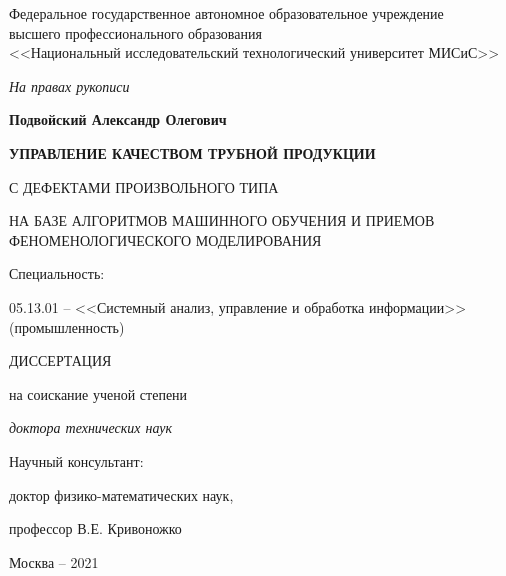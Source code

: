 \thispagestyle{empty}%
	\begin{center}
		Федеральное государственное автономное образовательное учреждение\\

		высшего профессионального образования\\

		<<Национальный исследовательский технологический университет МИСиС>>
	\end{center}
	\vspace{\baselineskip}\vspace{-5mm}

	\begin{flushright}
		\itshape
		На правах рукописи
	\end{flushright}
	\vspace{\baselineskip}\vspace{-5mm}
	
	\begin{center}
		\textbf{Подвойский Александр Олегович}
	\end{center}
	\vspace{5mm}
	
	\begin{center}
		\bfseries
			УПРАВЛЕНИЕ КАЧЕСТВОМ ТРУБНОЙ ПРОДУКЦИИ

			С ДЕФЕКТАМИ ПРОИЗВОЛЬНОГО ТИПА

			НА БАЗЕ АЛГОРИТМОВ МАШИННОГО ОБУЧЕНИЯ И ПРИЕМОВ ФЕНОМЕНОЛОГИЧЕСКОГО МОДЕЛИРОВАНИЯ
	\end{center}
	\vspace{\baselineskip}\vspace{-12mm}
	
	\begin{center}
		Специальность:
		
		05.13.01 -- <<Системный анализ, управление и обработка информации>> (промышленность)
	\end{center}
	\vspace{\baselineskip}\vspace{-8mm}

	\begin{center}
		ДИССЕРТАЦИЯ
		
		на соискание ученой степени
		
		\emph{доктора технических наук}
	\end{center}
	\vspace{\baselineskip}\vspace{5mm}

	\begin{flushright}
		Научный консультант:
		
		доктор физико-математических наук,
		
		профессор В.Е. Кривоножко
	\end{flushright}

	\vfill
	\begin{center}
		Москва -- 2021
	\end{center}
\newpage
